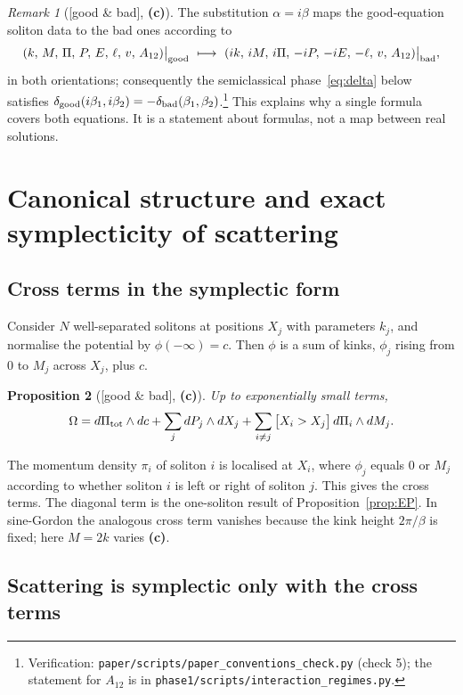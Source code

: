 \documentclass[11pt,a4paper]{article}
\newcommand{\lab}[1]{{\normalfont\sffamily\footnotesize\bfseries(#1)}}
\newcommand{\Lc}{\lab{c}}
\newcommand{\eqtag}[2]{{\normalfont\sffamily\footnotesize\textcolor{#1}{[#2]}}}
\newcommand{\Both}{\eqtag{violet!70!black}{good \& bad}}
\newcommand{\scr}[1]{\nolinkurl{#1}}
\newcommand{\chk}[1]{\footnote{\raggedright Verification: #1.}}
\newtheorem{proposition}{Proposition}[section]
\theoremstyle{remark}
\newtheorem{remark}[proposition]{Remark}
\begin{document}
\begin{remark}[\Both, \Lc]\label{rem:continuation}
The substitution $\alpha=i\beta$ maps the good-equation soliton data to the bad ones according to
\[
(k,\,M,\,\Pi,\,P,\,E,\,\ell,\,v,\,A_{12})\big|_{\rm good}\ \longmapsto\ (ik,\,iM,\,i\Pi,\,-iP,\,-iE,\,-\ell,\,v,\,A_{12})\big|_{\rm bad},
\]
in both orientations; consequently the semiclassical phase~\eqref{eq:delta} below satisfies $\delta_{\rm good}(i\beta_1,i\beta_2)=-\delta_{\rm bad}(\beta_1,\beta_2)$.\chk{\scr{paper/scripts/paper_conventions_check.py} (check 5); the statement for $A_{12}$ is in \scr{phase1/scripts/interaction_regimes.py}} This explains why a single formula covers both equations. It is a statement about formulas, not a map between real solutions.
\end{remark}

\section{Canonical structure and exact symplecticity of scattering}\label{sec:canonical}

\subsection{Cross terms in the symplectic form}

Consider $N$ well-separated solitons at positions $X_j$ with parameters $k_j$, and normalise the potential by $\phi(-\infty)=c$. Then $\phi$ is a sum of kinks, $\phi_j$ rising from $0$ to $M_j$ across $X_j$, plus $c$.

\begin{proposition}[\Both, \Lc]\label{prop:Omega}
Up to exponentially small terms,
\begin{equation}\label{eq:Omega}
\Omega=d\Pi_{\rm tot}\wedge dc+\sum_jdP_j\wedge dX_j+\sum_{i\neq j}\big[X_i>X_j\big]\,d\Pi_i\wedge dM_j .
\end{equation}
\end{proposition}
The momentum density $\pi_i$ of soliton $i$ is localised at $X_i$, where $\phi_j$ equals $0$ or $M_j$ according to whether soliton $i$ is left or right of soliton $j$. This gives the cross terms. The diagonal term is the one-soliton result of Proposition~\ref{prop:EP}. In sine-Gordon the analogous cross term vanishes because the kink height $2\pi/\beta$ is fixed; here $M=2k$ varies \Lc.

\subsection{Scattering is symplectic only with the cross terms}
\end{document}

